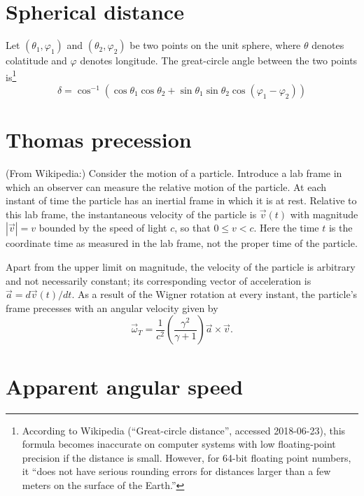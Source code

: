 \documentclass{book}
\newcommand{\phase}{\varphi}
\begin{document}
\section{Spherical distance}

Let $(\theta_1,\phase_1)$ and $(\theta_2,\phase_2)$ be two points on the unit sphere, where $\theta$ denotes colatitude and $\phase$ denotes longitude.
The great-circle angle between the two points is\footnote{According to Wikipedia (``Great-circle distance'', accessed 2018-06-23), this formula becomes inaccurate on computer systems with low floating-point precision if the distance is small. However, for 64-bit floating point numbers, it ``does not have serious rounding errors for distances larger than a few meters on the surface of the Earth.''}
\begin{equation}
    \delta = \cos^{-1}(\cos\theta_1 \cos\theta_2 + \sin\theta_1 \sin\theta_2 \cos(\phase_1 - \phase_2))
\end{equation}

\section{Thomas precession}

(From Wikipedia:) Consider the motion of a particle.
Introduce a lab frame in which an observer can measure the relative motion of the particle.
At each instant of time the particle has an inertial frame in which it is at rest.
Relative to this lab frame, the instantaneous velocity of the particle is $\vec{v}(t)$ with magnitude $|\vec{v}| = v$ bounded by the speed of light $c$, so that $0 \le v < c$.
Here the time $t$ is the coordinate time as measured in the lab frame, not the proper time of the particle.

Apart from the upper limit on magnitude, the velocity of the particle is arbitrary and not necessarily constant; its corresponding vector of acceleration is $\vec{a} = d\vec{v}(t)/dt$.
As a result of the Wigner rotation at every instant, the particle's frame precesses with an angular velocity given by
\begin{equation}
    \vec{\omega}_T = \frac{1}{c^2}\left(\frac{\gamma^2}{\gamma + 1}\right)\vec{a}\times\vec{v}.
\end{equation}

\section{Apparent angular speed}
\end{document}
